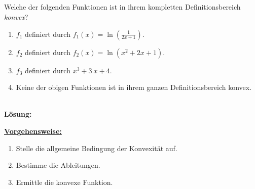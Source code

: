 \newpage

\subsection*{}
Welche der folgenden Funktionen ist in ihrem kompletten Definitionsbereich \textit{konvex}?
\renewcommand{\labelenumi}{(\alph{enumi})}
\begin{enumerate}
\item $f_1$ definiert durch $f_1(x) = \ln \left(\frac{1}{2x +1} \right)$.
\item $f_2$ definiert durch $f_2(x) = \ln(x^2 + 2x +1 )$.
\item $f_3$ definiert durch $x^3 + 3 \ x + 4 $.
\item Keine der obigen Funktionen ist in ihrem ganzen Definitionsbereich konvex.
\end{enumerate}
\ \\
\textbf{Lösung:}
\begin{mdframed}
\underline{\textbf{Vorgehensweise:}}
\renewcommand{\labelenumi}{\theenumi.}
\begin{enumerate}
\item Stelle die allgemeine Bedingung der Konvexität auf.
\item Bestimme die Ableitungen.
\item Ermittle die konvexe Funktion.
\end{enumerate}
\end{mdframed}

